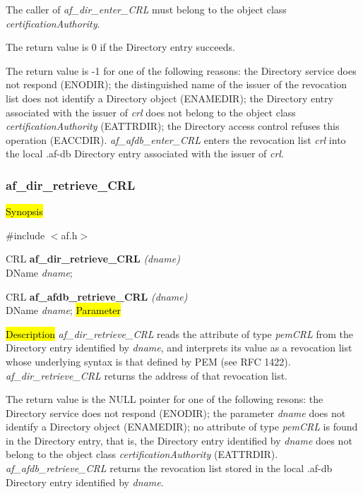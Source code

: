 The caller of {\em af\_dir\_enter\_CRL} must belong to the object class 
{\em certificationAuthority}.

The return value is 0 if the Directory entry succeeds.

The return value is -1 for one of the following reasons:
\bi
\m the Directory service does not respond (ENODIR);
\m the distinguished name of the issuer of the revocation list does not identify a Directory 
object (ENAMEDIR);
\m the Directory entry associated with the issuer of {\em crl} does not belong to the
object class {\em certificationAuthority} (EATTRDIR);
\m the Directory access control refuses this operation (EACCDIR).
\ei
{\em af\_afdb\_enter\_CRL} enters the revocation list {\em crl} 
into the local .af-db Directory entry associated with the issuer of {\em crl}.



\subsubsection{af\_dir\_retrieve\_CRL}

\hl{Synopsis}

\#include $<$af.h$>$

CRL {\bf *af\_dir\_retrieve\_CRL} {\em (dname)} \\
DName {\em *dname};

CRL {\bf *af\_afdb\_retrieve\_CRL} {\em (dname)} \\
DName {\em *dname};
\hl{Parameter}

\hl{Description}
{\em af\_dir\_retrieve\_CRL} reads the attribute of type {\em pemCRL} from the Directory entry 
identified by {\em dname}, and interprets its value as a revocation list whose underlying
syntax is that defined by PEM (see RFC 1422).
{\em af\_dir\_retrieve\_CRL} returns the address of that revocation list.

The return value is the NULL pointer for one of the following resons:
\bi
\m the Directory service does not respond (ENODIR);
\m the parameter {\em dname} does not identify a Directory object (ENAMEDIR);
\m no attribute of type {\em pemCRL} is found in the Directory entry, that is, the 
Directory entry identified by {\em dname} does not belong to 
the object class {\em certificationAuthority} (EATTRDIR).
\ei
{\em af\_afdb\_retrieve\_CRL} returns the revocation list 
stored in the local .af-db Directory entry identified by {\em dname}.



